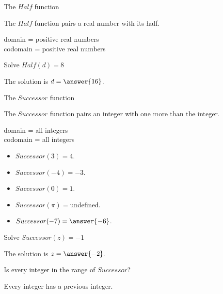 \documentclass{ximera}
\begin{document}
\begin{example} The $Half$ function 


The $Half$ function pairs a real number with its half.


domain = positive real numbers  \\
codomain = positive real numbers


Solve $Half(d) = 8$ 

The solution is $d = \answer{16}$.

\end{example} 







\begin{example} The $Successor$ function


The $Successor$ function pairs an integer with one more than the integer.

domain = all integers   \\
codomain = all integers


\begin{itemize}
\item $Successor(3) = 4$.
\item $Successor(-4) = -3$.
\item $Successor(0) = 1$.
\item $Successor(\pi) = $undefined.

\item $Successor(-7) = \answer{-6}$.
\end{itemize}


Solve $Successor(z) = -1$ 

The solution is $z = \answer{-2}$.

\end{example} 







\begin{question} 
Is every integer in the range of $Successor$?


\begin{multipleChoice}
\end{multipleChoice}
\begin{feedback}
Every integer has a previous integer.  
\end{feedback}
\end{question} 
\end{document}
